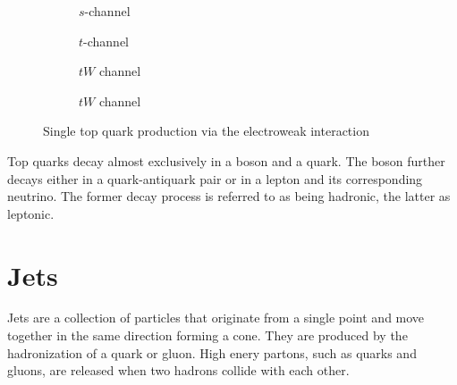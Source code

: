 \begin{figure}[H]
    \centering
    \begin{subfigure}[t]{0.2\textwidth}
        \centering
        
        \caption{$s$-channel}
        \label{fig:top_single_s}
    \end{subfigure}\hfill
    \begin{subfigure}[t]{0.2\textwidth}
        \centering
        
        \caption{$t$-channel}
        \label{fig:top_single_t}
    \end{subfigure}\hfill
    \begin{subfigure}[t]{0.2\textwidth}
        \centering
        
        \caption{$tW$ channel}
        \label{fig:top_single_tw_1}
    \end{subfigure}\hfill
    \begin{subfigure}[t]{0.2\textwidth}
        \centering
        
        \caption{$tW$ channel}
        \label{fig:top_single_tw_2}
    \end{subfigure}
    \caption{Single top quark production via the electroweak interaction}
    \label{fig:top_single}
\end{figure}
Top quarks decay almost exclusively in a \PW boson and a \Pbottom quark. The boson further decays either in a quark-antiquark pair or in a lepton and its corresponding neutrino. The former decay process is referred to as being hadronic, the latter as leptonic.

\section{Jets}
Jets are a collection of particles that originate from a single point and move together in the same direction forming a cone. They are produced by the hadronization of a quark or gluon. High enery partons, such as quarks and gluons, are released when two hadrons collide with each other.